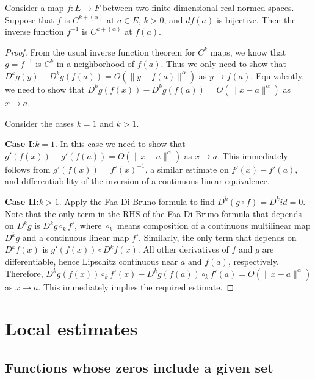 \begin{theorem}%
  \label{thm:cdh-at-inverse}
  Consider a map \(f\colon E\to F\) between two finite dimensional real normed spaces.
  Suppose that \(f\) is \(C^{k+(\alpha)}\) at \(a \in E\), \(k > 0\), and \(df(a)\) is bijective.
  Then the inverse function \(f^{-1}\) is \(C^{k+(\alpha)}\) at \(f(a)\).
\end{theorem}
\begin{proof}
  From the usual inverse function theorem for \(C^{k}\) maps,
  we know that \(g=f^{-1}\) is \(C^{k}\) in a neighborhood of \(f(a)\).
  Thus we only need to show that \(D^{k}g(y)-D^{k}g(f(a)) = O\left(\|y - f(a)\|^{\alpha}\right)\) as \(y \to f(a)\).
  Equivalently, we need to show that \(D^{k}g(f(x)) - D^{k}g(f(a)) = O\left(\|x - a\|^{\alpha}\right)\) as \(x\to a\).

  Consider the cases \(k = 1\) and \(k > 1\).

  \textbf{Case I:\@\(k = 1\)}. In this case we need to show that
  \(g'(f(x)) - g'(f(a)) = O\left(\|x - a\|^{\alpha}\right)\) as \(x\to a\).
  This immediately follows from \(g'(f(x)) = {f'(x)}^{-1}\),
  a similar estimate on \(f'(x) - f'(a)\),
  and differentiability of the inversion of a continuous linear equivalence.

  \textbf{Case II:\@\(k > 1\)}.
  Apply the Faa Di Bruno formula to find \(D^{k}(g \circ f) = D^{k} id =0\).
  Note that the only term in the RHS of the Faa Di Bruno formula
  that depends on \(D^{k}g\) is \(D^{k}g\circ_{k} f'\),
  where \(\circ_{k}\) means composition of a continuous multilinear map \(D^{k}g\)
  and a continuous linear map \(f'\).
  Similarly, the only term that depends on \(D^{k}f(x)\) is \(g'(f(x))\circ D^{k}f(x)\).
  All other derivatives of \(f\) and \(g\) are differentiable,
  hence Lipschitz continuous near \(a\) and \(f(a)\), respectively.
  Therefore, \(D^{k}g(f(x))\circ_{k}f'(x) - D^{k}g(f(a))\circ_{k}f'(a)=O\left(\|x - a\|^{\alpha}\right)\) as \(x\to a\).
  This immediately implies the required estimate.
\end{proof}

\chapter{Local estimates}%
\label{cha:local-estimates}

\section{Functions whose zeros include a given set}

